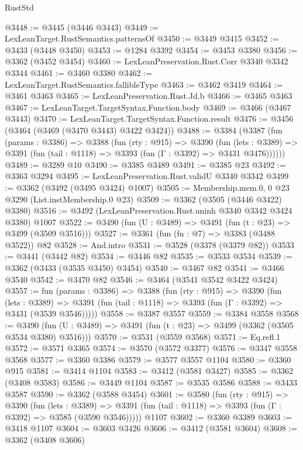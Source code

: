 \begin{lexlean}{RustStd}
\begin{coremodule}
@3448 := @3445 (@3446 @3443)
@3449 := LexLeanTarget.RustSemantics.patternsOf
@3450 := @3449 @3415
@3452 := @3433 (@3448 @3450)
@3453 := @1284 @3392
@3454 := @3453 @3380
@3456 := @3362 (@3452 @3454)
@3460 := LexLeanPreservation.Rust.Corr @3340 @3342 @3344
@3461 := @3460 @3380
@3462 := LexLeanTarget.RustSemantics.fallibleType
@3463 := @3462 @3419
@3464 := @3461 @3463
@3465 := LexLeanPreservation.Rust.Jd.b
@3466 := @3465 @3463
@3467 := LexLeanTarget.TargetSyntax.Function.body
@3469 := @3466 (@3467 @3443)
@3470 := LexLeanTarget.TargetSyntax.Function.result
@3476 := @3456 (@3464 (@3469 (@3470 @3443) @3422 @3424))
@3488 := @3384
    (@3387
      (fun (params : @3386) =>
      @3388
        (fun (rty : @915) =>
        @3390
          (fun (lets : @3389) =>
          @3391 (fun (tail : @1118) => @3393 (fun (Γ : @3392) => @3431 @3476))))))
@3489 := @3289 @10
@3490 := @3385 @3489
@3491 := @3385 @23
@3492 := @3363 @3294
@3495 := LexLeanPreservation.Rust.validU @3340 @3342
@3499 := @3362 (@3492 (@3495 @3424) @1007)
@3505 := Membership.mem.{0, 0} @23 @3290 (List.instMembership.{0} @23)
@3509 := @3362 (@3505 (@3446 @3422) @3380)
@3516 := @3492 (LexLeanPreservation.Rust.uninh @3340 @3342 @3424 @3380) @1007
@3522 := @3490 (fun (U : @3489) => @3491 (fun (t : @23) => @3499 (@3509 @3516)))
@3527 := @3361 (fun (fn : @7) => @3383 (@3488 @3522)) @82
@3528 := And.intro
@3531 := @3528 (@3378 (@3379 @82))
@3533 := @3441 (@3442 @82)
@3534 := @3446 @82
@3535 := @3533 @3534
@3539 := @3362 (@3433 (@3535 @3450) @3454)
@3540 := @3467 @82
@3541 := @3466 @3540
@3542 := @3470 @82
@3546 := @3464 (@3541 @3542 @3422 @3424)
@3557 := fun (params : @3386) =>
  @3388
    (fun (rty : @915) =>
    @3390
      (fun (lets : @3389) =>
      @3391 (fun (tail : @1118) => @3393 (fun (Γ : @3392) => @3431 (@3539 @3546)))))
@3558 := @3387 @3557
@3559 := @3384 @3558
@3568 := @3490 (fun (U : @3489) => @3491 (fun (t : @23) => @3499 (@3362 (@3505 @3534 @3380) @3516)))
@3570 := @3531 (@3559 @3568)
@3571 := Eq.refl.{1}
@3572 := @3571 @3365
@3574 := @3570 (@3572 @3377)
@3576 := @3347 @3558 @3568
@3577 := @3360 @3386
@3579 := @3577 @3557 @1104
@3580 := @3360 @915
@3581 := @3414 @1104
@3583 := @3412 (@3581 @3427)
@3585 := @3362 (@3408 @3583)
@3586 := @3449 @1104
@3587 := @3535 @3586
@3588 := @3433 @3587
@3590 := @3362 (@3588 @3454)
@3601 := @3580
    (fun (rty : @915) =>
    @3390
      (fun (lets : @3389) =>
      @3391 (fun (tail : @1118) => @3393 (fun (Γ : @3392) => @3585 (@3590 @3546)))))
    @1107
@3602 := @3360 @3389
@3603 := @3418 @1107
@3604 := @3603 @3426
@3606 := @3412 (@3581 @3604)
@3608 := @3362 (@3408 @3606)

\end{coremodule}
\end{lexlean}
